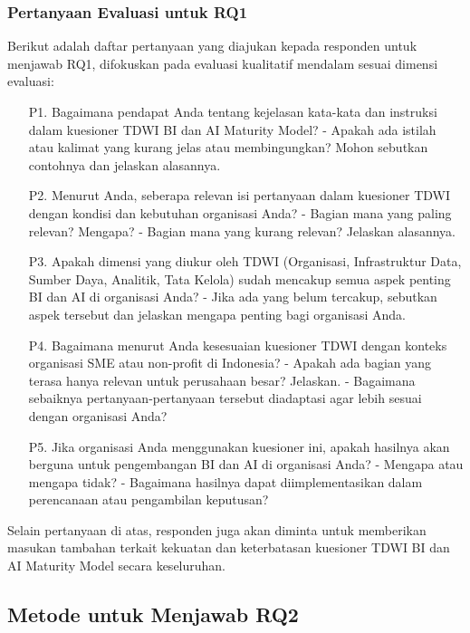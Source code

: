 \documentclass{article}
\begin{document}
\subsubsection{Pertanyaan Evaluasi untuk RQ1}
Berikut adalah daftar pertanyaan yang diajukan kepada responden untuk menjawab RQ1, difokuskan pada evaluasi kualitatif mendalam sesuai dimensi evaluasi:

\begin{enumerate}
	\item[P1.] Bagaimana pendapat Anda tentang kejelasan kata-kata dan instruksi dalam kuesioner TDWI BI dan AI Maturity Model?  
	- Apakah ada istilah atau kalimat yang kurang jelas atau membingungkan? Mohon sebutkan contohnya dan jelaskan alasannya.
	
	\item[P2.] Menurut Anda, seberapa relevan isi pertanyaan dalam kuesioner TDWI dengan kondisi dan kebutuhan organisasi Anda?  
	- Bagian mana yang paling relevan? Mengapa?  
	- Bagian mana yang kurang relevan? Jelaskan alasannya.
	
	\item[P3.] Apakah dimensi yang diukur oleh TDWI (Organisasi, Infrastruktur Data, Sumber Daya, Analitik, Tata Kelola) sudah mencakup semua aspek penting BI dan AI di organisasi Anda?  
	- Jika ada yang belum tercakup, sebutkan aspek tersebut dan jelaskan mengapa penting bagi organisasi Anda.
	
	\item[P4.] Bagaimana menurut Anda kesesuaian kuesioner TDWI dengan konteks organisasi SME atau non-profit di Indonesia?  
	- Apakah ada bagian yang terasa hanya relevan untuk perusahaan besar? Jelaskan.  
	- Bagaimana sebaiknya pertanyaan-pertanyaan tersebut diadaptasi agar lebih sesuai dengan organisasi Anda?
	
	\item[P5.] Jika organisasi Anda menggunakan kuesioner ini, apakah hasilnya akan berguna untuk pengembangan BI dan AI di organisasi Anda?  
	- Mengapa atau mengapa tidak?  
	- Bagaimana hasilnya dapat diimplementasikan dalam perencanaan atau pengambilan keputusan?
\end{enumerate}

Selain pertanyaan di atas, responden juga akan diminta untuk memberikan masukan tambahan terkait kekuatan dan keterbatasan kuesioner TDWI BI dan AI Maturity Model secara keseluruhan.


\subsection{Metode untuk Menjawab RQ2}
\end{document}
